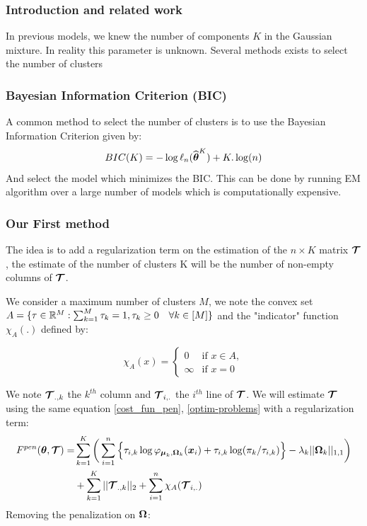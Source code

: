 \subsubsection{Introduction and related work}
In previous models, we knew the number of components $K$ in the Gaussian mixture. In reality this parameter is unknown. 
Several methods exists to select the number of clusters

\subsubsection{Bayesian Information Criterion (BIC)}
A common method to select the number of clusters is to use the Bayesian Information Criterion given by:
\begin{equation}
  BIC(K) = -\log\ell_n(\widehat{{\boldsymbol\theta}}^K)+K.\log(n)
\end{equation}
And select the model which minimizes the BIC. This can be done by running EM algorithm over a large number of models which is computationally expensive.

\subsubsection{Our First method}

The idea is to add a regularization term on the estimation of the $n\times K$ matrix $\boldsymbol{\mathcal T}$, the estimate of the number of clusters K will be the number of non-empty columns of $\boldsymbol{\mathcal T}$.\

We consider a maximum number of clusters $M$, we note the convex set $A=\{\tau \in {\mathbb R}^M : \sum_{k=1}^M\tau_k=1, \tau_k\geq 0 \quad \forall k \in [M] \}$ and the "indicator" function $\chi_A(.)$ defined by:


  \begin{equation*}
    \chi_A(x) =
    \begin{cases}
      0 & \text{if } x \in A,\\
        \infty & \text{if } x = 0
    \end{cases}
\end{equation*}

We note $\boldsymbol{\mathcal T}_{.,k}$ the $k^{th}$ column and $\boldsymbol{\mathcal T}_{i,.}$ the $i^{th}$ line of $\boldsymbol{\mathcal T}$. We will estimate $\boldsymbol{\mathcal T}$ using the same equation \ref{cost_fun_pen}, \ref{optim-problems} with a regularization term:\\
\begin{align*}
F^{pen}({\boldsymbol\theta},\boldsymbol{\mathcal T})  =& \sum_{k=1}^K \bigg(\sum_{i=1}^{n} \Big\{\tau_{i,k}\log\varphi_{\boldsymbol\mu_{k},\boldsymbol\Omega_{k}}(\boldsymbol x_i)+\tau_{i,k}
    \log(\pi_k/\tau_{i,k})\Big\}-\lambda_k||\boldsymbol\Omega_k||_{1,1}\bigg)\\ 
    &+ \sum_{k=1}^K ||\boldsymbol{\mathcal T}_{.,k}||_{2} + \sum_{i=1}^{n} \chi_A(\boldsymbol{\mathcal T}_{i,.})
\end{align*}
Removing the penalization on $\boldsymbol\Omega$:

